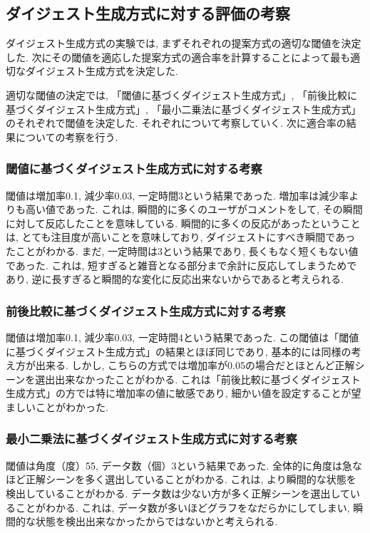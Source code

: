 \subsection{ダイジェスト生成方式に対する評価の考察}
ダイジェスト生成方式の実験では, まずそれぞれの提案方式の適切な閾値を決定した. 次にその閾値を適応した提案方式の適合率を計算することによって最も適切なダイジェスト生成方式を決定した.

適切な閾値の決定では, 「閾値に基づくダイジェスト生成方式」, 「前後比較に基づくダイジェスト生成方式」, 「最小二乗法に基づくダイジェスト生成方式」のそれぞれで閾値を決定した. それぞれについて考察していく. 次に適合率の結果についての考察を行う.

\subsubsection{閾値に基づくダイジェスト生成方式に対する考察}
閾値は増加率0.1, 減少率0.03, 一定時間3という結果であった. 増加率は減少率よりも高い値であった. これは, 瞬間的に多くのユーザがコメントをして, その瞬間に対して反応したことを意味している. 瞬間的に多くの反応があったということは, とても注目度が高いことを意味しており, ダイジェストにすべき瞬間であったことがわかる. まだ, 一定時間は3という結果であり, 長くもなく短くもない値であった. これは, 短すぎると雑音となる部分まで余計に反応してしまうためであり, 逆に長すぎると瞬間的な変化に反応出来ないからであると考えられる.

\subsubsection{前後比較に基づくダイジェスト生成方式に対する考察}
閾値は増加率0.1, 減少率0.03, 一定時間4という結果であった. この閾値は「閾値に基づくダイジェスト生成方式」の結果とほぼ同じであり, 基本的には同様の考え方が出来る. しかし, こちらの方式では増加率が0.05の場合だとほとんど正解シーンを選出出来なかったことがわかる. これは「前後比較に基づくダイジェスト生成方式」の方では特に増加率の値に敏感であり, 細かい値を設定することが望ましいことがわかった.

\subsubsection{最小二乗法に基づくダイジェスト生成方式に対する考察}
閾値は角度（度）55, データ数（個）3という結果であった. 全体的に角度は急なほど正解シーンを多く選出していることがわかる. これは, より瞬間的な状態を検出していることがわかる. データ数は少ない方が多く正解シーンを選出していることがわかる. これは, データ数が多いほどグラフをなだらかにしてしまい, 瞬間的な状態を検出出来なかったからではないかと考えられる.

